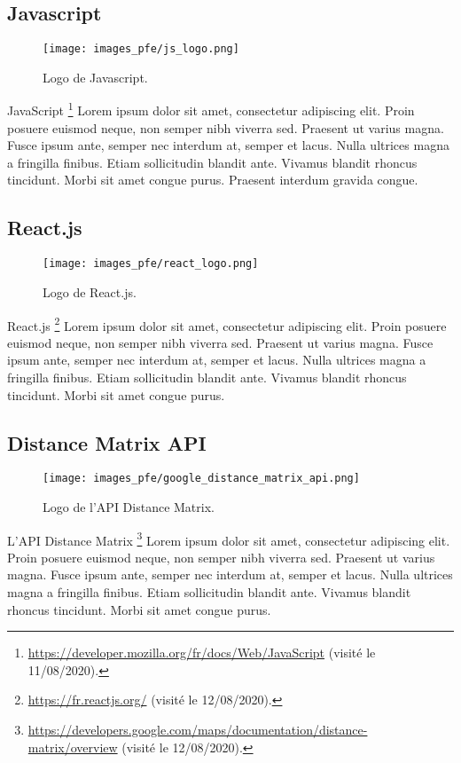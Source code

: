 \vspace{.5cm}

\subsection*{Javascript}
\begin{wrapfigure}[6]{r}{0.3\textwidth}
  \centering
  \texttt{[image: images\_pfe/js\_logo.png]}
  \caption{Logo de Javascript.}
\end{wrapfigure}
\FloatBarrier
JavaScript \footnote{\url{https://developer.mozilla.org/fr/docs/Web/JavaScript} (visité le 11/08/2020).} Lorem ipsum dolor sit amet, consectetur adipiscing elit. Proin posuere euismod neque, non semper nibh viverra sed. Praesent ut varius magna. Fusce ipsum ante, semper nec interdum at, semper et lacus. Nulla ultrices magna a fringilla finibus. Etiam sollicitudin blandit ante. Vivamus blandit rhoncus tincidunt. Morbi sit amet congue purus. Praesent interdum gravida congue. 

\vspace{3cm}

\subsection*{React.js}

\begin{wrapfigure}[6]{r}{0.3\textwidth}
  \centering
  \texttt{[image: images\_pfe/react\_logo.png]}
  \caption{Logo de React.js.}
\end{wrapfigure}
\FloatBarrier
React.js \footnote{\url{https://fr.reactjs.org/} (visité le 12/08/2020).} Lorem ipsum dolor sit amet, consectetur adipiscing elit. Proin posuere euismod neque, non semper nibh viverra sed. Praesent ut varius magna. Fusce ipsum ante, semper nec interdum at, semper et lacus. Nulla ultrices magna a fringilla finibus. Etiam sollicitudin blandit ante. Vivamus blandit rhoncus tincidunt. Morbi sit amet congue purus. 

\vspace{1cm}

\subsection*{Distance Matrix API}
\begin{wrapfigure}[6]{r}{0.3\textwidth}
  \centering
  \texttt{[image: images\_pfe/google\_distance\_matrix\_api.png]}
  \caption{Logo de l'API Distance Matrix.}
\end{wrapfigure}
\FloatBarrier
L'API Distance Matrix \footnote{\url{https://developers.google.com/maps/documentation/distance-matrix/overview} (visité le 12/08/2020).} Lorem ipsum dolor sit amet, consectetur adipiscing elit. Proin posuere euismod neque, non semper nibh viverra sed. Praesent ut varius magna. Fusce ipsum ante, semper nec interdum at, semper et lacus. Nulla ultrices magna a fringilla finibus. Etiam sollicitudin blandit ante. Vivamus blandit rhoncus tincidunt. Morbi sit amet congue purus. 

